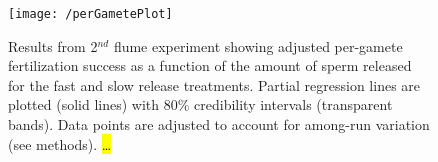 \documentclass{article}
\begin{document}
\begin{figure}[!ht] 
\texttt{[image: /perGametePlot]}
\caption{Results from 2$^{nd}$ flume experiment showing adjusted per-gamete fertilization success as a function of the amount of sperm released for the fast and slow release treatments. Partial regression lines are plotted (solid lines) with $80\%$ credibility intervals (transparent bands). Data points are adjusted to account for among-run variation (see methods).  \hl{\ldots}}
\label{fig:perGamete}
\end{figure}
\newpage{}




\renewcommand{\thefigure}{A\arabic{figure}}
\setcounter{figure}{0}





\end{document}
